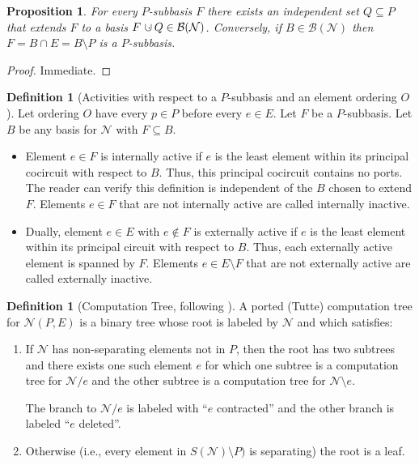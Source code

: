\documentclass[12pt]{article}
\newtheorem{proposition}[theorem]{Proposition}
\theoremstyle{definition}
\newtheorem{definition}[theorem]{Definition}
\newcommand{\dunion}
{\mbox{\hbox{\hskip6pt$\cdot$\hskip-5.50pt$\cup$\hskip2pt}}}
\begin{document}
\begin{proposition}
For every $P$-subbasis $F$ there exists an independent set $Q\subseteq P$
that extends $F$ to a basis $F\dunion Q\in \mathcal{B}(\mathcal{N})$.
Conversely, if $B\in\mathcal{B}(\mathcal{N})$ then $F=B\cap E=B\setminus P$
is a $P$-subbasis.
\end{proposition}

\begin{proof} Immediate. \end{proof}

\begin{definition}[Activities with respect to a $P$-subbasis and an element
ordering $O$]
Let ordering $O$ have every $p\in P$ before every
$e\in E$.  Let $F$ be a $P$-subbasis.  Let $B$ be any basis for 
$\mathcal{N}$ with $F\subseteq B$.
\begin{itemize}
\item Element $e\in F$
is internally active if $e$ is the least element
within its principal cocircuit with respect to $B$.  Thus, this principal
cocircuit contains no ports.  The reader can verify this definition is 
independent of the $B$ chosen to extend $F$.  Elements $e\in F$ that are
not internally active are called internally inactive.
\item Dually, element $e\in E$ with $e\not\in F$ is externally 
active if $e$ is the least element within its principal circuit with
respect to $B$.  Thus, each externally active element is spanned by 
$F$.  Elements $e\in E\setminus F$ that are not externally active
are called externally inactive.
\end{itemize}
\end{definition}

\begin{definition}[Computation Tree, following \cite{GordonMcMachonGreedoid}]
\label{CompTreeDef}
A ported (Tutte) computation tree for $\mathcal{N}(P,E)$ is a
binary tree whose root is labeled by $\mathcal{N}$ and which satisfies:
\begin{enumerate}
\item If $\mathcal{N}$ has non-separating elements not in $P$, then 
the root has two subtrees and there exists one such element $e$ for which 
one subtree is a computation tree
for $\mathcal{N}/e$ and the other subtree is a computation tree for 
$\mathcal{N}\setminus e$.

The branch to $\mathcal{N}/e$ is labeled with ``$e$ contracted'' and 
the other branch is labeled ``$e$ deleted''.
\item Otherwise (i.e., every element in $S(\mathcal{N})\setminus P)$
is separating) the root is a leaf.
\end{enumerate}
\end{definition}
\end{document}

